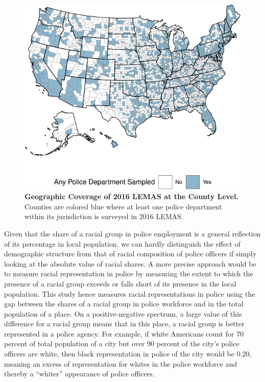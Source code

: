 \documentclass[
  12pt,
]{article}
\begin{document}
\begin{figure}[tb]

{\centering \includegraphics{racialized-police_files/figure-pdf/fig-lemas-cover-1.pdf}

}

\caption{\label{fig-lemas-cover}\textbf{Geographic Coverage of 2016
LEMAS at the County Level.} Counties are colored blue where at least one
police department within its jurisdiction is surveyed in 2016 LEMAS.}

\end{figure}

Given that the share of a racial group in police employment is a general
reflection of its percentage in local population, we can hardly
distinguish the effect of demographic structure from that of racial
composition of police officers if simply looking at the absolute value
of racial shares. A more precise approach would be to measure racial
representation in police by measuring the extent to which the presence
of a racial group exceeds or falls short of its presence in the local
population. This study hence measures racial representations in police
using the gap between the shares of a racial group in police workforce
and in the total population of a place. On a positive-negative spectrum,
a large value of this difference for a racial group means that in this
place, a racial group is better represented in a police agency. For
example, if white Americans count for 70 percent of total population of
a city but over 90 percent of the city's police officers are white, then
black representation in police of the city would be 0.20, meaning an
excess of representation for whites in the police workforce and thereby
a ``whiter'' appearance of police officers.
\end{document}
